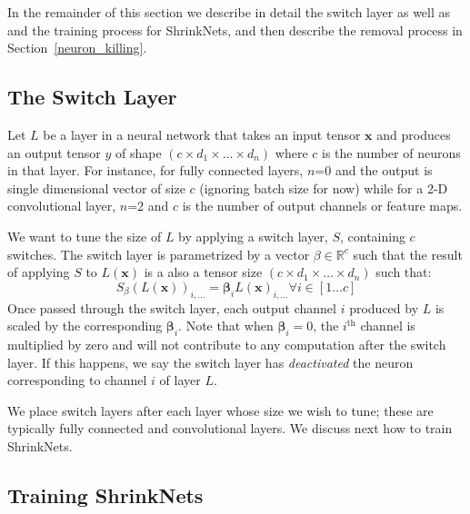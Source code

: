 In the remainder of this section we describe in detail the switch layer as well
as and the training process for ShrinkNets, and then describe the removal process in Section~\ref{neuron_killing}.

\subsection{The Switch Layer}

Let $L$ be a layer in a neural network that takes an input tensor $\bm{x}$ and
produces an output tensor $y$ of shape $\left(c \times d_1 \times \dots \times
d_n\right)$ where $c$ is the number of neurons in that layer.  For instance, for
fully connected layers, $n$=0 and the output is single dimensional vector of size $c$
(ignoring batch size for now) while for a 2-D convolutional layer, $n$=2 and $c$
is the number of output channels or feature maps.

We want to tune the size of $L$ by applying a switch layer, $S$, containing $c$
switches.  The switch
layer is parametrized by a vector $\beta \in \mathbb{R}^c$ such that the result
of applying $S$ to $L(\bm{x})$ is a also a tensor size $\left(c \times d_1
\times \dots \times d_n\right)$ such that: 
\begin{equation} 
S_{\beta}(L(\bm{x}))_{i,...} = \bm{\beta}_iL(\bm{x})_{i, ...} \forall i \in [1\ldots c]
\end{equation}
Once passed through the switch layer, each output channel $i$
produced by $L$ is scaled by the corresponding $\bm{\beta}_i$. Note that when
$\bm{\beta}_i = 0$, the $i^{\text{th}}$ channel is multiplied by zero and will not
contribute to any computation after the switch layer. If this happens, we say
the switch layer has {\it deactivated} the neuron corresponding to channel $i$ of layer $L$.

We place switch layers after each layer whose size we wish to tune; these are
typically fully connected and convolutional layers. We discuss next how to train
ShrinkNets.

\subsection{Training ShrinkNets} 


